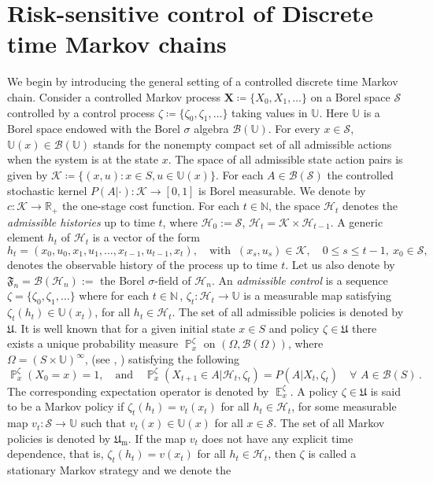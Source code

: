 \documentclass[notitlepage,11pt,reqno]{amsart}
\numberwithin{equation}{section}
\theoremstyle{plain}
\theoremstyle{definition}
\theoremstyle{remark}
\newcommand{\Act}{{\mathds{U}}}
\newcommand{\sB}{{\mathscr{B}}}
\newcommand{\sF}{\mathfrak{F}}      %
\newcommand{\sH}{{\mathscr{H}}}
\newcommand{\sK}{{\mathscr{K}}}
\newcommand{\cS}{{\mathcal{S}}}     %
\newcommand{\Uadm}{\mathfrak{U}}
\newcommand{\Um}{\mathfrak{U}_{\mathrm{m}}}
\newcommand{\RR}{\mathds{R}} %
\newcommand{\NN}{\mathds{N}} %
\DeclareMathOperator{\Exp}{\mathbb{E}} %
\DeclareMathOperator{\Prob}{\mathbb{P}} %
\newcommand{\df}{\coloneqq}
\begin{document}
\section{Risk-sensitive control of Discrete time Markov chains}\label{S-DTMC}
We begin by introducing the general setting of a controlled discrete time Markov chain.
Consider a controlled Markov process $\textbf{X} \df \{X_0, X_1,\dots\}$ on a Borel space
$\cS$
controlled by a control process $\zeta \df \{\zeta_0,\zeta_1,\dots \}$ taking values in $\Act$. Here $\Act$ is a Borel space endowed with the Borel $\sigma$ algebra $\sB(\Act)$. For every $x\in \cS$, $\Act(x) \in \sB(\Act)$ stands for the nonempty compact set of all admissible actions when the system is at the state $x$. The space of all admissible state action pairs is given by $\sK \df \{(x,u) : x\in S, u\in \Act(x)\}$. For each $A\in \sB(\cS)$ the controlled stochastic kernel $P(A |\cdot):\sK\to [0,1]$ is Borel measurable. 
We denote by $c:\sK \to \RR_{+}$ the one-stage cost function. For each $t\in\NN$, the space $\sH_t$ denotes the {\it admissible histories} up to time $t$, where $\sH_0 := \cS$, $\sH_t = \sK\times\sH_{t-1}$.
A generic element $h_t$ of $\sH_t$ is a vector of the form
$$
h_t=(x_0, u_0, x_1, u_1, \ldots, x_{t-1}, u_{t-1}, x_t),
\quad \text{with}\;\;(x_s, u_s)\in\sK,\quad 0\leq s\leq t-1, \ x_0\in \cS,
$$
denotes the observable history of the process up to time $t$.
Let us also denote by $\sF_n=\sB(\sH_n) :=$ the Borel $\sigma$-field of $\sH_n$.
An {\it admissible control}  is a sequence $\zeta = \{\zeta_0,\zeta_1,\dots \}$ where for each $t\in\NN$\,, $\zeta_t : \sH_t\to\Act$ is a measurable map satisfying $\zeta_t(h_t)\in\Act({x_t})$, for all $h_t\in\sH_t$. The set of all admissible policies is denoted by $\Uadm$. It is well known that for a given initial state $x\in S$ and policy $\zeta\in\Uadm$ there exists a unique probability measure $\Prob_x^{\zeta}$ on 
$(\Omega, \sB(\Omega))$, where $\Omega=(S\times\Act)^\infty$, (see 
\cite[p.4]{H89}, \cite{ABFGM93}) satisfying the following
\begin{equation}\label{Markov1}
\Prob_x^\zeta(X_0=x)=1,\quad \text{and}\quad
\Prob_x^{\zeta}(X_{t+1} \in A | \sH_t, \zeta_t) = P(A | X_t, \zeta_t)\quad \forall \,\, A\in \sB(S)\,.
\end{equation}
The corresponding expectation operator is denoted by $\Exp_x^{\zeta}$. A policy $\zeta\in\Uadm$ is said to be a Markov policy if $\zeta_t(h_t) = v_t(x_t)$ for all $h_t\in\sH_t$, for some measurable map 
$v_t:\cS\to\Act$ such that $v_t(x)\in\Act(x)$ for all $x\in\cS$. The set of all Markov policies is denoted by $\Um$. If the map $v_t$ does not have any explicit time dependence, that is, $\zeta_t (h_t) = v(x_t)$ for all $h_t\in\sH_t$, then $\zeta$ is called a stationary Markov strategy and  we denote the 
\end{document}
